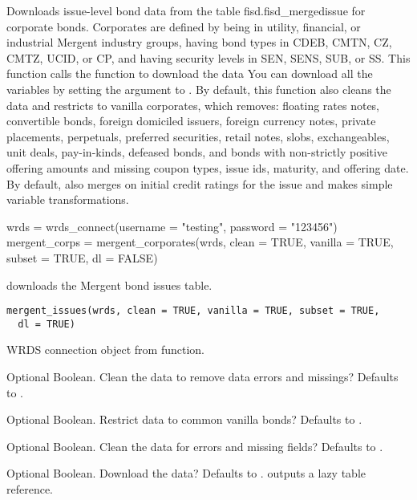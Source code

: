 \documentclass[a4paper]{book}
\begin{document}
%
\begin{Details}\relax
Downloads issue-level bond data from the table fisd.fisd\_mergedissue for corporate bonds.
Corporates are defined by being in utility, financial, or industrial Mergent industry groups,
having bond types in CDEB, CMTN, CZ, CMTZ, UCID, or CP, and having security levels in
SEN, SENS, SUB, or SS. This function calls the  function to download the
data You can download all the variables by setting the 
argument to . By default, this function also cleans the data and restricts to
vanilla corporates, which removes: floating rates notes, convertible bonds, foreign domiciled
issuers, foreign currency notes, private placements, perpetuals, preferred securities,
retail notes, slobs, exchangeables, unit deals, pay-in-kinds, defeased bonds, and bonds with
non-strictly positive offering amounts and missing coupon types, issue ids, maturity, and
offering date. By default, also merges on initial credit ratings for the issue and makes
simple variable transformations.
\end{Details}
%
\begin{Examples}
\begin{ExampleCode}
wrds = wrds_connect(username = "testing", password = "123456")
mergent_corps = mergent_corporates(wrds, clean = TRUE, vanilla = TRUE, subset = TRUE, dl = FALSE)
\end{ExampleCode}
\end{Examples}
%
\begin{Description}\relax
{} downloads the Mergent bond issues table.
\end{Description}
%
\begin{Usage}
\begin{verbatim}
mergent_issues(wrds, clean = TRUE, vanilla = TRUE, subset = TRUE,
  dl = TRUE)
\end{verbatim}
\end{Usage}
%
\begin{Arguments}
\begin{ldescription}
\item[\code{wrds}] WRDS connection object from  function.

\item[\code{clean}] Optional Boolean. Clean the data to remove data errors and missings? Defaults to
.

\item[\code{vanilla}] Optional Boolean. Restrict data to common vanilla bonds? Defaults to .

\item[\code{subset}] Optional Boolean. Clean the data for errors and missing fields? Defaults to
.

\item[\code{dl}] Optional Boolean. Download the data? Defaults to .  outputs a
lazy  table reference.
\end{ldescription}
\end{Arguments}
\end{document}

